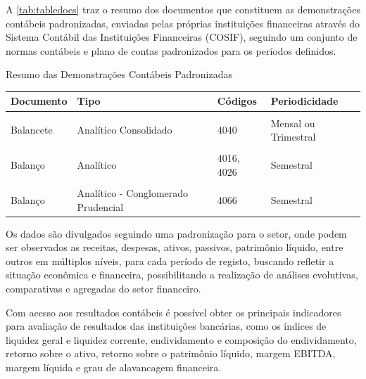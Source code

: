\documentclass[
  12pt,
  12pt,
  openright,
  oneside,
  a4paper,
  chapter=TITLE,
  section=TITLE,
  subsection=TITLE,
  subsubsection=TITLE,
  portugues,
  sumario=tradicional]{abntex2}
\begin{document}
A \autoref{tab:tabledocs} traz o resumo dos documentos que constituem as demonstrações contábeis padronizadas, enviadas pelas próprias instituições financeiras através do Sistema Contábil das Instituições Financeiras (COSIF), seguindo um conjunto de normas contábeis e plano de contas padronizados para os períodos definidos.

\begin{qdr}
\vspace{20pt}
\caption{Resumo das Demonstrações Contábeis Padronizadas}
\vspace{1mm}
\begingroup\fontsize{10}{12}\selectfont

\begin{tabu} to 
\toprule
Documento & Tipo & Códigos & Periodicidade\\
\midrule
{} &  &  & \\
Balancete & Analítico Consolidado & 4040 & Mensal ou Trimestral\\
 &  &  & \\
Balanço & Analítico & 4016, 4026 & Semestral\\
 &  &  & \\
\addlinespace
Balanço & Analítico - Conglomerado Prudencial & 4066 & Semestral\\
\bottomrule
\end{tabu}
\endgroup{}
\vspace{1mm}
\label{tab:tabledocs}
\vspace{-2mm}
\end{qdr}

Os dados são divulgados seguindo uma padronização para o setor, onde podem ser observados as receitas, despesas, ativos, passivos, patrimônio líquido, entre outros em múltiplos níveis, para cada período de registo, buscando refletir a situação econômica e financeira, possibilitando a realização de análises evolutivas, comparativas e agregadas do setor financeiro.

Com acesso aos resultados contábeis é possível obter os principais indicadores para avaliação de resultados das instituições bancárias, como os índices de liquidez geral e liquidez corrente, endividamento e composição do endividamento, retorno sobre o ativo, retorno sobre o patrimônio líquido, margem EBITDA, margem líquida e grau de alavancagem financeira.
\end{document}
